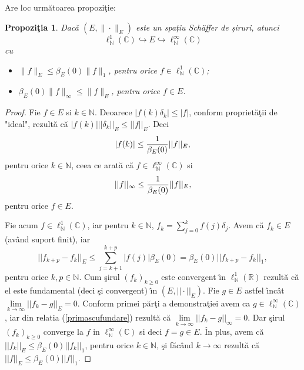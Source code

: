 \documentclass[ a4paper, 12pt]{report}
\newcommand{\C}{\mathbb{C}}
\newcommand{\N}{\mathbb{N}}
\newtheorem{prop}[theorem]{\bf Propozi\c tia }
\theoremstyle{definition}
\theoremstyle{remark}
\numberwithin{equation}{section}
\begin{document}
\bigskip

Are loc urm\u atoarea propozi\c  tie:

\begin{prop}
\label{prop1:structureofSchaffercl}
Dac\u a  $(E,\|\cdot\|_{E})$ este un spa\c tiu Sch\"{a}ffer de \c siruri, atunci
$$\ell^1_{\N}(\C)\hookrightarrow E\hookrightarrow \ell^{\infty}_{\N}(\C)$$ cu
\begin{itemize}
\item[(i)] $\|f\|_{E}\leq\beta_{E}(0)\|f\|_1$, pentru orice $f\in\ell^1_{\N}(\C)$;

\item[(ii)] $\beta_{E}(0)\|f\|_{\infty}\leq \|f\|_{E}$, pentru orice $f\in E$.
\end{itemize}
\end{prop}

\begin{proof}
Fie $f \in E$ si $k \in \mathbb{N}$.
Deoarece $|f(k) \delta_k| \leq |f|$, conform propriet\u a\c tii de "ideal", rezult\u a c\u a $|f(k)| ||\delta_k||_E
\leq ||f||_E$. Deci
$$|f(k)| \leq \displaystyle\frac{1}{\beta_E(0)}||f||_E,$$ pentru orice $k \in
\mathbb{N}$, ceea ce arat\u a c\u a $f \in \ell^\infty_\mathbb{N}(\mathbb{C})$ si
\begin{eqnarray}\label{primascufundare}
||f||_\infty \leq \displaystyle\frac{1}{\beta_E(0)}||f||_E,
\end{eqnarray}
pentru orice  $f \in E$.

Fie acum $f \in \ell^1_\N (\mathbb{C})$, iar pentru $k \in
\mathbb{N}$, $f_k = \sum\limits_{j = 0}^k f(j)\delta_j$. Avem c\u a
$f_k \in E$ (av\^ and suport finit), iar
$$||f_{k + p} - f_k||_E \leq \sum\limits_{j = k + 1}^{k + p}
|f(j)| \beta_E(0) = \beta_E(0) ||f_{k + p} - f_k||_1,$$ pentru orice $k, p
\in \mathbb{N}$. Cum \c sirul $(f_k)_{k \geq 0}$ este convergent \^\i n
$\ell^1_\N(\mathbb{R})$ rezult\u a c\u a el este fundamental
(deci \c si convergent) \^\i n $(E, ||\cdot||_E)$. Fie $g \in E$ astfel
\^\i nc\^ at $\lim\limits_{k \to \infty} ||f_k - g||_E = 0$. Conform
primei p\u ar\c ti a demonstra\c tiei avem ca $g \in
\ell^\infty_\N(\mathbb{C})$, iar din relatia
(\ref{primascufundare}) rezult\u a c\u a $\lim\limits_{k \to \infty}
||f_k - g||_\infty = 0$. Dar \c sirul $(f_k)_{k \geq 0}$ converge la
$f$ in $\ell^\infty_\N (\mathbb{C})$ si deci $f = g \in
E$. \^ In plus, avem c\u a $||f_k||_E \leq \beta_E(0) ||f_k||_1$, pentru
orice $k \in \mathbb{N}$, \c si f\u ac\^ and $ k \to \infty$ rezult\u a c\u a
$||f||_E \leq \beta_E(0) ||f||_1$.
\end{proof}
\end{document}
